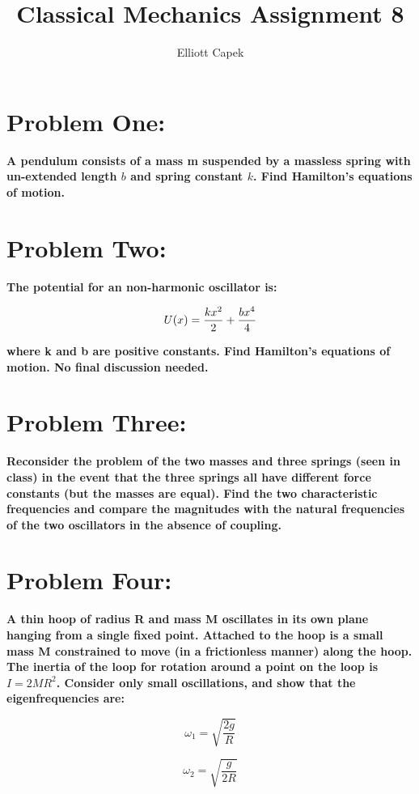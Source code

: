 \documentclass[10pt]{article} %
\title{Classical Mechanics Assignment 8}
\author{Elliott Capek}
\begin{document}
\maketitle{}

\section{Problem One: }
\textbf{A pendulum consists of a mass m suspended by a massless spring with un-extended length $b$ and spring constant $k$. Find Hamilton’s equations of motion.}

\section{Problem Two: }
\textbf{The potential for an non-harmonic oscillator is:}

\begin{equation*}
  U(x) = \frac{kx^2}{2} + \frac{bx^4}{4}\\
\end{equation*}

\textbf{where k and b are positive constants. Find Hamilton’s equations of motion. No final discussion needed.}

\section{Problem Three: }
\textbf{Reconsider the problem of the two masses and three springs (seen in class) in the event that the three springs all have different force constants (but the masses are equal). Find the two characteristic frequencies and compare the magnitudes with the natural frequencies of the two oscillators in the absence of coupling.}

\section{Problem Four: }
\textbf{A thin hoop of radius R and mass M oscillates in its own plane hanging from a single fixed point. Attached to the hoop is a small mass M constrained to move (in a frictionless manner) along the hoop. The inertia of the loop for rotation around a point on the loop is $I=2MR^2$. Consider only small oscillations, and show that the eigenfrequencies are:}

\begin{equation*}
  \omega_1 = \sqrt{\frac{2g}{R}}
\end{equation*}

\begin{equation*}
  \omega_2 = \sqrt{\frac{g}{2R}}
\end{equation*}
\end{document}
